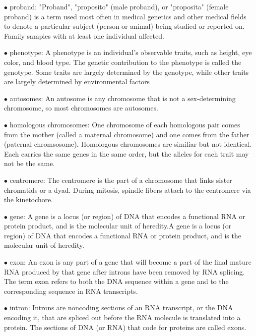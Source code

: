 \documentclass{article}
\begin{document}
\vspace{0.1in}
$\bullet$ proband:
"Proband", "proposito" (male proband), or "proposita" (female proband) is a term used most often in medical genetics and other medical fields to denote a particular subject (person or animal) being studied or reported on.
Family samples with at least one individual affected. 

\vspace{0.1in}
$\bullet$ phenotype:
A phenotype is an individual's observable traits, such as height, eye color, and blood type. The genetic contribution to the phenotype is called the genotype. Some traits are largely determined by the genotype, while other traits are largely determined by environmental factors


\vspace{0.1in}
$\bullet$ autosomes:
An autosome is any chromosome that is not a sex-determining chromosome, so most chromosomes are autosomes.


\vspace{0.1in}
$\bullet$ homologous chromosomes:
One chromosome of each homologous pair comes from the mother (called a maternal chromosome) and one comes from the father (paternal chromsosome). Homologous chromosomes are similiar but not identical. Each carries the same genes in the same order, but the alleles for each trait may not be the same.


\vspace{0.1in}
$\bullet$ centromere:
The centromere is the part of a chromosome that links sister chromatids or a dyad. During mitosis, spindle fibers attach to the centromere via the kinetochore. 


\vspace{0.1in}
$\bullet$ gene:
A gene is a locus (or region) of DNA that encodes a functional RNA or protein product, and is the molecular unit of heredity.A gene is a locus (or region) of DNA that encodes a functional RNA or protein product, and is the molecular unit of heredity.


\vspace{0.1in}
$\bullet$ exon:
An exon is any part of a gene that will become a part of the final mature RNA produced by that gene after introns have been removed by RNA splicing. The term exon refers to both the DNA sequence within a gene and to the corresponding sequence in RNA transcripts.


\vspace{0.1in}
$\bullet$ intron:
Introns are noncoding sections of an RNA transcript, or the DNA encoding it, that are spliced out before the RNA molecule is translated into a protein. The sections of DNA (or RNA) that code for proteins are called exons.
\end{document}
